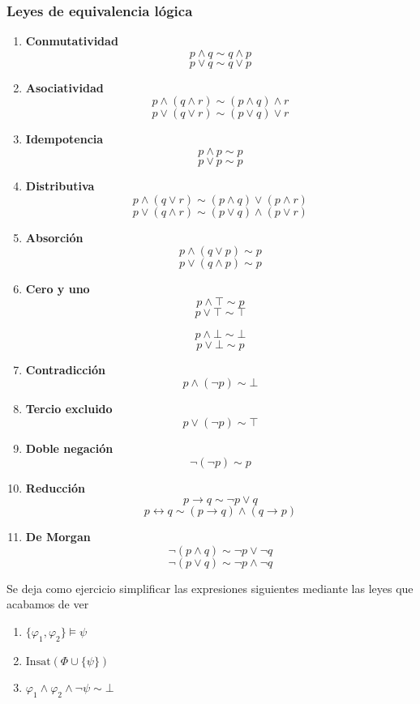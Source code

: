 \subsubsection{Leyes de equivalencia lógica}
\begin{enumerate}
	\item \textbf{Conmutatividad}
	\[ p \wedge q \sim q \wedge p \]
	\[ p \lor q \sim q \lor p \]
	\item \textbf{Asociatividad}
	\[ p \wedge (q \wedge r) \sim (p \wedge q) \wedge r \]
	\[ p \lor (q \lor r) \sim (p \lor q) \lor r \]
	\item \textbf{Idempotencia}
	\[ p \wedge p \sim p\]
	\[ p \lor p \sim p\]
	\item \textbf{Distributiva}
	\[ p \wedge (q \lor r) \sim (p \wedge q) \lor (p \wedge r) \]
	\[ p \lor (q \wedge r) \sim (p \lor q) \wedge (p \lor r) \]
	\item \textbf{Absorción}
	\[ p \wedge (q \lor p) \sim p \]
	\[ p \lor (q \wedge p) \sim p \]
	\item \textbf{Cero y uno}
	\[ p \wedge \top \sim p \]
	\[ p \lor \top \sim \top \]
	
	\[ p \wedge \bot \sim \bot \]
	\[ p \lor \bot \sim p \]
	\item \textbf{Contradicción}
	\[ p \wedge (\neg p) \sim \bot \]
	\item \textbf{Tercio excluido}
	\[ p \lor (\neg p) \sim \top \]
	\item \textbf{Doble negación}
	\[ \neg (\neg p) \sim p \]
	\item \textbf{Reducción}
	\[ p \rightarrow q \sim \neg p \lor q \]
	\[ p \leftrightarrow q \sim (p \rightarrow q) \wedge (q \rightarrow p) \]
	\item \textbf{De Morgan}
	\[ \neg(p \wedge q) \sim \neg p \lor \neg q\]
	\[ \neg(p \lor q) \sim \neg p \wedge \neg q\]
\end{enumerate}

Se deja como ejercicio simplificar las expresiones siguientes mediante las leyes que acabamos de ver 
\begin{enumerate}
	\item $ \{ \varphi_1, \varphi_2 \} \models \psi $
	\item $ \mbox{Insat}(\Phi \cup \{\psi\} ) $
	\item $ \varphi_1 \wedge \varphi_2 \wedge \neg \psi \sim \bot $
\end{enumerate}